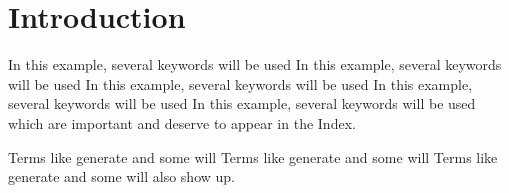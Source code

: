 \documentclass{article}
\begin{document}
\section{Introduction}
In this example, several keywords will be used
In this example, several keywords will be used
In this example, several keywords will be used
In this example, several keywords will be used
In this example, several keywords will be used
which are important and deserve to appear in the Index.

Terms like generate and some will
Terms like generate and some will
Terms like generate and some will
also show up.
\end{document}
